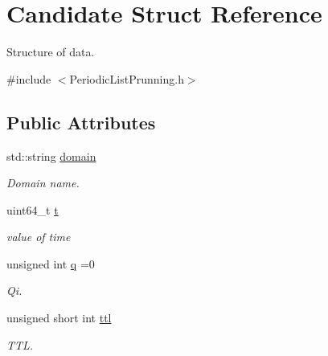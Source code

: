 \hypertarget{structCandidate}{}\section{Candidate Struct Reference}
\label{structCandidate}


Structure of data.  




{\ttfamily \#include $<$Periodic\+List\+Prunning.\+h$>$}

\subsection*{Public Attributes}
\begin{DoxyCompactItemize}
\item 
\mbox{\label{structCandidate_a3c0030ea11a52038701c2ca76705941a}} 
std\+::string \hyperlink{structCandidate_a3c0030ea11a52038701c2ca76705941a}{domain}
\begin{DoxyCompactList}\small\item\em Domain name. \end{DoxyCompactList}\item 
\mbox{\label{structCandidate_aa85886d00c41915acae10e4a3d8843c5}} 
uint64\+\_\+t \hyperlink{structCandidate_aa85886d00c41915acae10e4a3d8843c5}{t}
\begin{DoxyCompactList}\small\item\em value of time \end{DoxyCompactList}\item 
\mbox{\label{structCandidate_a79a1c268d8000a91b0c0e5108d3bbddc}} 
unsigned int \hyperlink{structCandidate_a79a1c268d8000a91b0c0e5108d3bbddc}{q} =0
\begin{DoxyCompactList}\small\item\em Qi. \end{DoxyCompactList}\item 
\mbox{\label{structCandidate_a31bee50333f716d41d0d2b456d1a9cbc}} 
unsigned short int \hyperlink{structCandidate_a31bee50333f716d41d0d2b456d1a9cbc}{ttl}
\begin{DoxyCompactList}\small\item\em T\+TL. \end{DoxyCompactList}\item 

\end{DoxyCompactItemize}
